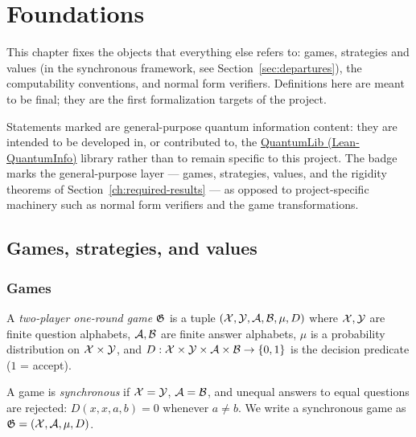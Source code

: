 \section{Foundations}
\label{ch:foundations}

This chapter fixes the objects that everything else refers to: games, strategies and
values (in the synchronous framework, see Section~\ref{sec:departures}), the
computability conventions, and normal form verifiers. Definitions here are meant to be
final; they are the first formalization targets of the project.

Statements marked \qlib{} are general-purpose quantum information content: they are
intended to be developed in, or contributed to, the
\href{\qliburl}{QuantumLib (Lean-QuantumInfo)} library rather than to remain specific
to this project. The badge marks the general-purpose layer --- games, strategies,
values, and the rigidity theorems of Section~\ref{ch:required-results} --- as opposed
to project-specific machinery such as normal form verifiers and the game
transformations.

\subsection{Games, strategies, and values}

\subsubsection{Games}

\begin{definition}
\label{def:game}
\leanok
\qlib{}
A \emph{two-player one-round game} $\mathfrak{G}$ is a tuple
$(\mathcal{X}, \mathcal{Y}, \mathcal{A}, \mathcal{B}, \mu, D)$ where $\mathcal{X}, \mathcal{Y}$ are finite question alphabets, $\mathcal{A},
\mathcal{B}$ are finite answer alphabets, $\mu$ is a probability distribution on $\mathcal{X} \times
\mathcal{Y}$, and $D : \mathcal{X} \times \mathcal{Y} \times \mathcal{A} \times \mathcal{B} \to \{0,1\}$ is the decision
predicate ($1$ = accept).
\end{definition}

\begin{definition}
\label{def:sync-game}
\leanok
\qlib{}
A game is \emph{synchronous} if $\mathcal{X} = \mathcal{Y}$, $\mathcal{A} = \mathcal{B}$, and unequal answers to equal
questions are rejected: $D(x,x,a,b) = 0$ whenever $a \neq b$. We write a synchronous
game as $\mathfrak{G} = (\mathcal{X}, \mathcal{A}, \mu, D)$.
\end{definition}

